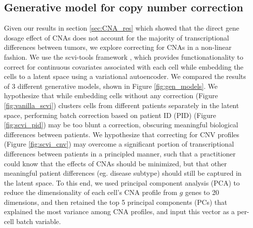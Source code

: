 \documentclass{article}
\begin{document}
\subsection{Generative model for copy number correction}
Given our results in section \ref{sec:CNA_res} which showed that the direct gene dosage effect of CNAs does not account for the majority of transcriptional differences between tumors, we explore correcting for CNAs in a non-linear fashion. We use the scvi-tools framework \citep{gayoso2022python}, which provides functionationality to correct for continuous covariates associated with each cell while embedding the cells to a latent space using a variational autoencoder. We compared the results of 3 different generative models, shown in Figure \ref{fig:gen_models}. We hypothesize that while embedding cells without any correction (Figure \ref{fig:vanilla_scvi}) clusters cells from different patients separately in the latent space, performing batch correction based on patient ID (PID) (Figure \ref{fig:scvi_pid}) may be too blunt a correction, obscuring meaningful biological differences between patients. We hypothesize that correcting for CNV profiles (Figure \ref{fig:scvi_cnv}) may overcome a significant portion of transcriptional differences between patients in a principled manner, such that a practitioner could know that the effects of CNAs should be minimized, but that other meaningful patient differences (eg. disease subtype) should still be captured in the latent space. To this end, we used principal component analysis (PCA) to reduce the dimensionality of each cell's CNA profile from $g$ genes to 20 dimensions, and then retained the top 5 principal components (PCs) that explained the most variance among CNA profiles, and input this vector as a per-cell batch variable.
\end{document}
